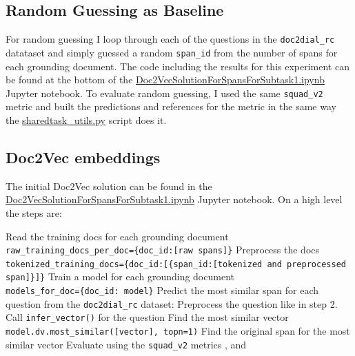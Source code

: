 \documentclass[11pt]{article}
\begin{document}
    \subsection{Random Guessing as Baseline}\label{subsec:random-guessing-experiment}
    For random guessing I loop through each of the questions in the \texttt{doc2dial\_rc} datataset and simply guessed a
    random \texttt{span\_id} from the number of spans for each grounding document. The code including the results for this experiment
    can be found at the bottom of the
    \href{https://github.com/isabelladegen/nlp-2021/blob/main/notebooks/Doc2VecSolutionForSpansForSubtask1.ipynb}{Doc2VecSolutionForSpansForSubtask1.ipynb}
    Jupyter notebook. To evaluate random guessing, I used the same \texttt{squad\_v2} metric and built the predictions and
    references for the metric in the same way the
    \href{https://github.com/doc2dial/sharedtask-dialdoc2021/blob/master/scripts/sharedtask_utils.py}{sharedtask\_utils.py}
    script does it.

    \subsection{Doc2Vec embeddings}\label{subsec:doc2vec-experiment}
    The initial Doc2Vec solution can be found in the \href{https://github.com/isabelladegen/nlp-2021/blob/main/notebooks/Doc2VecSolutionForSpansForSubtask1.ipynb}{Doc2VecSolutionForSpansForSubtask1.ipynb}
    Jupyter notebook.
    On a high level the steps are:
    \begin{outline}[enumerate]
        \1 Read the training docs for each grounding document\\ \texttt{raw\_training\_docs\_per\_doc=\{doc\_id:[raw spans]\}}
        \1 Preprocess the docs\\ \texttt{tokenized\_training\_docs=\{doc\_id:[\{span\_id:[tokenized and preprocessed span]\}]\}}
        \1 Train a model for each grounding document\\ \texttt{models\_for\_doc=\{doc\_id: model\}}
        \1 Predict the most similar span for each question from the \texttt{doc2dial\_rc} dataset:
        \2 Preprocess the question like in step 2.
        \2 Call \texttt{infer\_vector()} for the question
        \2 Find the most similar vector \texttt{model.dv.most\_similar([vector], topn=1)}
        \2 Find the original span for the most similar vector
        \1 Evaluate using the \texttt{squad\_v2} metrics \cite{squad2git}, \cite{gitTheStandfordQADataset} and \cite{Rajpurkar2016SQuAD10}
    \end{outline}
\end{document}
